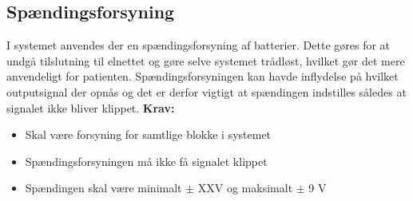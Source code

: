 \subsection{Spændingsforsyning}
I systemet anvendes der en spændingsforsyning af batterier. Dette gøres for at undgå tilslutning til elnettet og gøre selve systemet trådløst, hvilket gør det mere anvendeligt for patienten. Spændingsforsyningen kan havde inflydelse på hvilket outputsignal der opnås og det er derfor vigtigt at spændingen indstilles således at signalet ikke bliver klippet.
\textbf{Krav:}
\begin{itemize}
\item Skal være forsyning for samtlige blokke i systemet
\item Spændingsforsyningen må ikke få signalet klippet
\item Spændingen skal være minimalt $\pm$ XXV  og maksimalt $\pm$ 9 V
\end{itemize}

